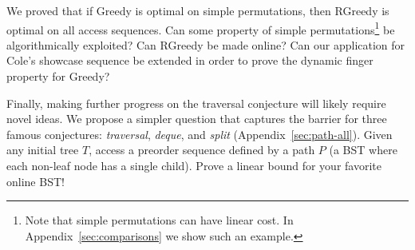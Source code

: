 \documentclass[english]{article}
\begin{document}
We proved that if {\sc Greedy} is optimal on simple permutations, then {\sc RGreedy} is optimal on all access sequences. Can some property of simple permutations\footnote{Note that simple permutations can have linear cost. In Appendix~\ref{sec:comparisons} we show such an example.} be algorithmically exploited? %
Can {\sc RGreedy} be made online? 
Can our application for Cole's showcase sequence be extended in order to prove the dynamic finger property for {\sc Greedy}? 

Finally, making further progress on the traversal conjecture will likely require novel ideas. 
We propose a simpler question that captures the barrier for three famous conjectures: {\em traversal}, {\em deque}, and {\em split} (Appendix~\ref{sec:path-all}). 
Given any initial tree $T$, access a preorder sequence defined by a path $P$ (a BST where each non-leaf node has a single child). 
Prove a linear bound for your favorite online BST! 


\newpage 



\newpage 
\appendix 
\clearpage


 
 
 

 
 

\end{document}
